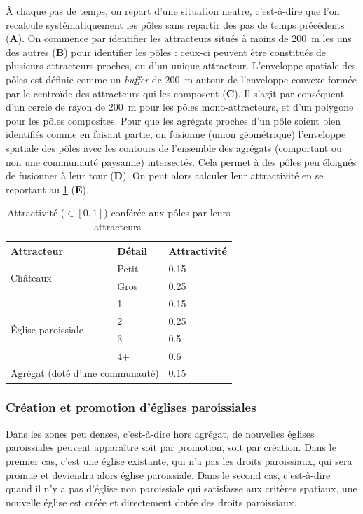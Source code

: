 À chaque pas de temps, on repart d'une situation \og neutre\fg{}, c'est-à-dire que l'on recalcule systématiquement les pôles sans repartir des pas de temps précédents (\textbf{A}).
On commence par identifier les attracteurs situés à moins de 200~m les uns des autres (\textbf{B}) pour identifier les pôles : ceux-ci peuvent être constitués de plusieurs attracteurs proches, ou d'un unique attracteur.
L'enveloppe spatiale des pôles est définie comme un \textit{buffer} de 200~m autour de l'enveloppe convexe formée par le centroïde des attracteurs qui les composent (\textbf{C}).
Il s'agit par conséquent d'un cercle de rayon de 200~m pour les pôles mono-attracteurs, et d'un polygone pour les pôles composites.
Pour que les agrégats proches d'un pôle soient bien identifiés comme en faisant partie, on fusionne (union géométrique) l'enveloppe spatiale des pôles avec les contours de l'ensemble des agrégats (comportant ou non une communauté paysanne) intersectés.
Cela permet à des pôles peu éloignés de fusionner à leur tour (\textbf{D}).
On peut alors calculer leur attractivité en se reportant au \cref{tab:attraction-poles} (\textbf{E}).

\begin{table}[H]
	\centering
	{\renewcommand{\arraystretch}{1.1}%
	\begin{tabular}{|l|l|l|}\hline
		\textbf{Attracteur} & \textbf{Détail} & \textbf{Attractivité} \\ \hline
		\multirow{2}{*}{Châteaux} & Petit & 0.15 \\
		& Gros & 0.25 \\ \hline
		\multirow{4}{*}{Église paroissiale} & 1 & 0.15 \\
		& 2 & 0.25 \\
		& 3 & 0.5 \\
		& 4+ & 0.6 \\ \hline
		\multicolumn{2}{|l|}{Agrégat (doté d'une communauté)} & 0.15 \\ \hline
	\end{tabular}}
\caption{Attractivité ($\in [0,1]$) conférée aux pôles par leurs attracteurs.}
\label{tab:attraction-poles}
\end{table}


	
\subsubsection{Création et promotion d'églises paroissiales \label{sssec:paroisses}}

Dans les zones peu denses, c'est-à-dire hors agrégat, de nouvelles églises paroissiales peuvent apparaître soit par promotion, soit par création.
Dans le premier cas, c'est une église existante, qui n'a pas les droits paroissiaux, qui sera promue et deviendra alors église paroissiale.
Dans le second cas, c'est-à-dire quand il n'y a pas d'église non paroissiale qui satisfasse aux critères spatiaux, une nouvelle église est créée et directement dotée des droits paroissiaux.

